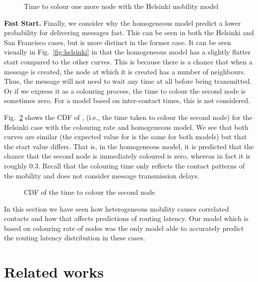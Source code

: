 \documentclass{article}
\begin{document}
\begin{figure}[htb]
  \centering
   \caption{Time to colour one more node with the Helsinki mobility model}
  \label{fig:helsinki-fdelta}
\end{figure}


{\bf Fast Start.} Finally, we consider why the homogeneous model
predict a lower probability for delivering messages fast. This can be
seen in both the Helsinki and San Francisco cases, but is more
distinct in the former case. It can be seen visually in
Fig.~\ref{fig:helsinki} in that the homogeneous model has a slightly
flatter start compared to the other curves. This is because there is a
chance that when a message is created, the node at which it is created
has a number of neighbours. Thus, the message will not need to wait
any time at all before being transmitted. Or if we express it as a
colouring process, the time to colour the second node is sometimes
zero. For a model based on inter-contact times, this is not
considered.


Fig.~\ref{fig:colsecond} shows the CDF of , (i.e., the time
taken to colour the second node) for the Helsinki case with the
colouring rate and homogeneous model. We see that both curves are
similar (the expected value for  is the same for both models) but
that the start value differs. That is, in the homogeneous model, it is
predicted that the chance that the second node is immediately
coloured is zero, whereas in fact it is roughly 0.3. Recall that the
colouring time only reflects the contact patterns of the mobility and
does not consider message transmission delays.

\begin{figure}[tb]
  \centering
   \caption{CDF of the time to colour the second node}
  \label{fig:colsecond}
\end{figure}
In this section we have seen how heterogeneous mobility causes
correlated contacts and how that affects predictions of routing
latency. Our model which is based on colouring rate of nodes was the
only model able to accurately predict the routing latency distribution
in these cases.



\section{Related works}
\label{sec:relatedworks}
\end{document}
